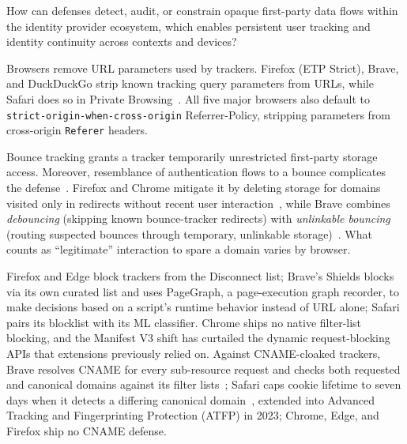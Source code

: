 \begin{opbox}
How can defenses detect, audit, or constrain opaque first-party data flows within the identity provider ecosystem, which enables persistent user tracking and identity continuity across contexts and devices?
\end{opbox}


%
Browsers remove URL parameters used by trackers.
%
Firefox (ETP Strict), Brave, and DuckDuckGo strip known tracking query parameters from URLs, while Safari does so in Private Browsing~\cite{TrackingPreventionWebKit2020}.
%
All five major browsers also default to \texttt{strict-origin-when-cross-origin} Referrer-Policy, stripping parameters from cross-origin \texttt{Referer} headers.


%
Bounce tracking grants a tracker temporarily unrestricted first-party storage access. 
%
Moreover, resemblance of authentication flows to a bounce complicates the defense~\cite{kellyBounceTrackingMitigations2022}.
%
Firefox and Chrome mitigate it by deleting storage for domains visited only in redirects without recent user interaction~\cite{snyderNavigationalTrackingMitigations2024}, while Brave combines \textit{debouncing} (skipping known bounce-tracker redirects) with \textit{unlinkable bouncing} (routing suspected bounces through temporary, unlinkable storage)~\cite{braveprivacyteamUnlinkableBouncingMore2022}.
%
What counts as ``legitimate'' interaction to spare a domain varies by browser.


%
Firefox and Edge block trackers from the Disconnect list; Brave's Shields blocks via its own curated list and uses PageGraph, a page-execution graph recorder, to make decisions based on a script's runtime behavior instead of URL alone; Safari pairs its blocklist with its ML classifier.
%
Chrome ships no native filter-list blocking, and the Manifest V3 shift has curtailed the dynamic request-blocking APIs that extensions previously relied on.
%
Against CNAME-cloaked trackers, Brave resolves CNAME for every sub-resource request and checks both requested and canonical domains against its filter lists~\cite{bravePrivacyProtectionSecurity}; Safari caps cookie lifetime to seven days when it detects a differing canonical domain~\cite{TrackingPreventionWebKit2020}, extended into Advanced Tracking and Fingerprinting Protection (ATFP) in 2023; Chrome, Edge, and Firefox ship no CNAME defense.


